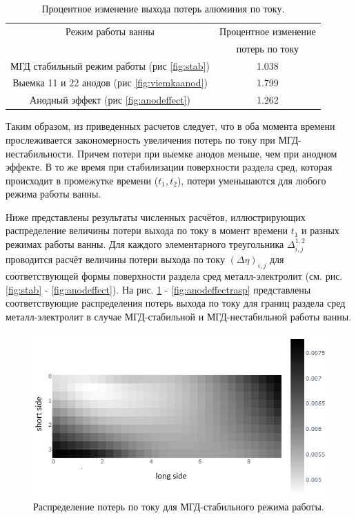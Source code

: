 \documentclass[pdflatex,sn-mathphys-gost]{pmi-jnl}
\begin{document}
\begin{table}[h]
\centering
\caption{Процентное изменение выхода потерь алюминия по току.}
\begin{tabular}{|c|c|}
\hline
Режим работы ванны & Процентное изменение \\
 					& потерь по току \\
\hline
МГД стабильный режим работы (рис \ref{fig:stab}) & 1.038	\\
\hline
Выемка 11 и 22 анодов (рис \ref{fig:viemkaanod}) &	1.799\\
\hline
Анодный эффект (рис \ref{fig:anodeffect}) & 1.262	\\
\hline
\end{tabular}
\label{table:ismineniep}
\end{table}

Таким образом, из приведенных расчетов следует, что в оба момента времени прослеживается закономерность увеличения потерь по току при МГД-нестабильности. Причем потери при выемке анодов меньше, чем при анодном эффекте. В то же время при стабилизации поверхности раздела сред, которая происходит в промежутке времени ($t_1, t_2$), потери уменьшаются для любого режима работы ванны.

Ниже представлены результаты численных расчётов, иллюстрирующих распределение величины потери выхода по току в момент времени $t_1$ и разных режимах работы ванны. Для каждого элементарного треугольника $\Delta^{1,2}_{i,j}$ проводится расчёт величины потери выхода по току $(\Delta\eta)_{i,j}$ для соответствующей формы поверхности раздела сред металл-электролит (см. рис. \ref{fig:stab} - \ref{fig:anodeffect}). На рис. \ref{fig:stabrasp} - \ref{fig:anodeffectrasp} представлены соответствующие распределения потерь выхода по току для границ раздела сред металл-электролит в случае МГД-стабильной и МГД-нестабильной работы ванны.

\begin{figure}[ht]
    \centering
    \includegraphics[width=\textwidth]{h.png}
    \caption{Распределение потерь по току для МГД-стабильного режима работы.}
    \label{fig:stabrasp}
\end{figure}
\end{document}
